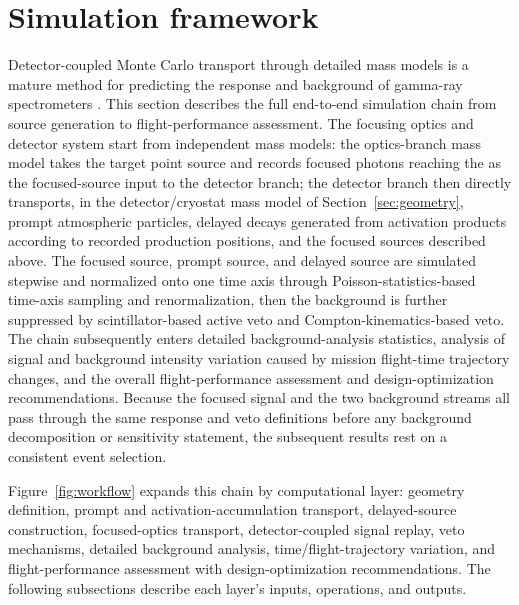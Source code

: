 \documentclass[11pt]{article}
\begin{document}
\FloatBarrier

\section{Simulation framework}
\label{sec:framework}

Detector-coupled Monte Carlo transport through detailed mass models is a mature method for predicting the response and background of gamma-ray spectrometers \cite{Sturner2003}. This section describes the full end-to-end simulation chain from source generation to flight-performance assessment. The focusing optics and detector system start from independent mass models: the optics-branch mass model takes the target point source and records focused photons reaching the  as the focused-source input to the detector branch; the detector branch then directly transports, in the detector/cryostat mass model of Section~\ref{sec:geometry}, prompt atmospheric particles, delayed decays generated from activation products according to recorded production positions, and the focused sources described above. The focused source, prompt source, and delayed source are simulated stepwise and normalized onto one time axis through Poisson-statistics-based time-axis sampling and renormalization, then the background is further suppressed by scintillator-based active veto and Compton-kinematics-based veto. The chain subsequently enters detailed background-analysis statistics, analysis of signal and background intensity variation caused by mission flight-time trajectory changes, and the overall flight-performance assessment and design-optimization recommendations. Because the focused signal and the two background streams all pass through the same response and veto definitions before any background decomposition or sensitivity statement, the subsequent results rest on a consistent event selection.

Figure~\ref{fig:workflow} expands this chain by computational layer: geometry definition, prompt and activation-accumulation transport, delayed-source construction, focused-optics transport, detector-coupled signal replay, veto mechanisms, detailed background analysis, time/flight-trajectory variation, and flight-performance assessment with design-optimization recommendations. The following subsections describe each layer's inputs, operations, and outputs.
\end{document}
